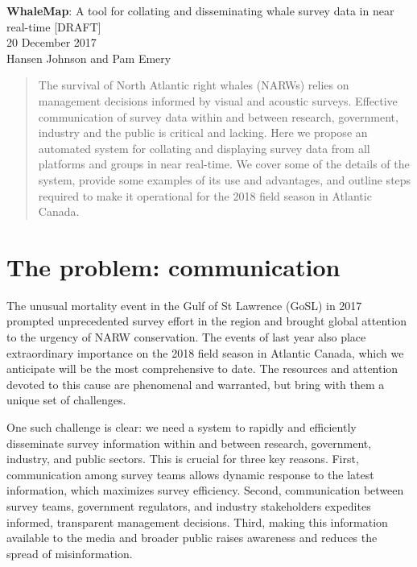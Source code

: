 \documentclass[11pt, letterpaper]{article}
\begin{document}

\begin{center}
	\Large \textbf{WhaleMap}: A tool for collating and disseminating whale survey data in near real-time [DRAFT] \\
	\bigskip
	\normalsize 20 December 2017 \\
	\normalsize Hansen Johnson and Pam Emery\\
	\bigskip
\end{center}

\begin{abstract}
	The survival of North Atlantic right whales (NARWs) relies on management decisions informed by visual and acoustic surveys. Effective communication of survey data within and between research, government, industry and the public is critical and lacking. Here we propose an automated system for collating and displaying survey data from all platforms and groups in near real-time. We cover some of the details of the system, provide some examples of its use and advantages, and outline steps required to make it operational for the 2018 field season in Atlantic Canada.
\end{abstract} 


\section{The problem: communication}

The unusual mortality event in the Gulf of St Lawrence (GoSL) in 2017 prompted unprecedented survey effort in the region and brought global attention to the urgency of NARW conservation. The events of last year also place extraordinary importance on the 2018 field season in Atlantic Canada, which we anticipate will be the most comprehensive to date. The resources and attention devoted to this cause are phenomenal and warranted, but bring with them a unique set of challenges. 

One such challenge is clear: we need a system to rapidly and efficiently disseminate survey information within and between research, government, industry, and public sectors. This is crucial for three key reasons. First, communication among survey teams allows dynamic response to the latest information, which maximizes survey efficiency. Second, communication between survey teams, government regulators, and industry stakeholders expedites informed, transparent management decisions. Third, making this information available to the media and broader public raises awareness and reduces the spread of misinformation. 
\end{document}
